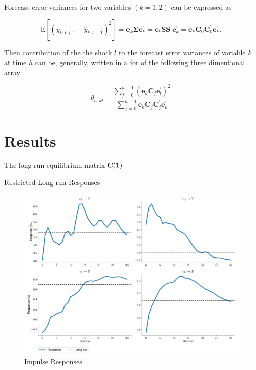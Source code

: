 \documentclass[a4paper,12pt]{article}
\begin{document}
Forecast error variances for two variables \((k=1,2)\) can be expressed as

\begin{equation} \label{eq:9}
		\mathrm{E}\left[\left(y_{k, t+1}-\hat{y}_{k, t+1}\right)^{2}\right]=\mathbf{e}_{k} \mathbf{\Sigma} \mathbf{e}_{k}^{\prime}=\mathbf{e}_{k} \mathbf{S S}^{\prime} \mathbf{e}_{k}^{\prime}=\mathbf{e}_{k} \mathbf{C}_{0} \mathbf{C}_{0}^{\prime} \mathbf{e}_{k}^{\prime}.
\end{equation}

Then contribution of the the shock \(l\) to the forecast error variances of variable \(k\) at time \(h\) can be, generally, written in a for of the following three dimentional array

\begin{equation} \label{eq:10}
		\theta_{h, k l}=\frac{\sum_{j=0}^{h-1}\left(\mathbf{e}_{k} \mathbf{C}_{j} \mathbf{e}_{l}^{\prime}\right)^{2}}{\sum_{j=0}^{h-1} \mathbf{e}_{k} \mathbf{C}_{j} \mathbf{C}_{j}^{\prime} \mathbf{e}_{k}^{\prime}}
\end{equation}

\newpage

\section{Results}

\blindtext

The long-run equilibrium matrix \(\bf C (1)\) 

\begin{table}[h]
\label{table:2}
\caption{Restricted Long-run Responses}
\centering

\end{table}

\blindtext

\begin{figure}[H]
    \centering
\caption{Impulse Responses}
    \includegraphics[width=\textwidth]{../output/figures/IR.pdf} 
\end{figure}
\end{document}
